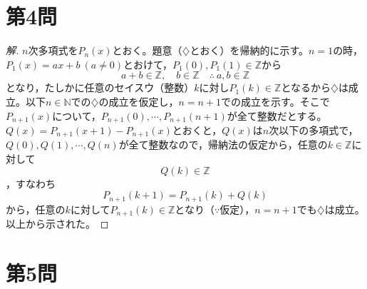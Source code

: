 \documentclass[../main.tex]{subfiles}
\begin{document}
\newpage

\section*{第4問}

\begin{proof}[解]
  $n$次多項式を$P_n(x)$とおく。題意（$\diamondsuit$とおく）を帰納的に示す。$n=1$の時，$P_1(x)=ax+b\ (a\ne0)$とおけて，$P_1(0),P_1(1)\in\mathbb{Z}$から
  \[
    a+b\in\mathbb{Z}, \quad b\in\mathbb{Z} \quad\therefore\ a,b\in\mathbb{Z}
  \]
  となり，たしかに任意のセイスウ（整数）$k$に対し$P_1(k)\in\mathbb{Z}$となるから$\diamondsuit$は成立。以下$n\in\mathbb{N}$での$\diamondsuit$の成立を仮定し，$n=n+1$での成立を示す。そこで$P_{n+1}(x)$について，$P_{n+1}(0),\cdots,P_{n+1}(n+1)$が全て整数だとする。$Q(x)=P_{n+1}(x+1)-P_{n+1}(x)$とおくと，$Q(x)$は$n$次以下の多項式で，$Q(0),Q(1),\cdots,Q(n)$が全て整数なので，帰納法の仮定から，任意の$k\in\mathbb{Z}$に対して
  \[
    Q(k)\in\mathbb{Z}
  \]
  ，すなわち
  \[
    P_{n+1}(k+1)=P_{n+1}(k)+Q(k)
  \]
  から，任意の$k$に対して$P_{n+1}(k)\in\mathbb{Z}$となり（$\because$仮定），$n=n+1$でも$\diamondsuit$は成立。以上から示された。
\end{proof}

\newpage

\section*{第5問}
\end{document}

